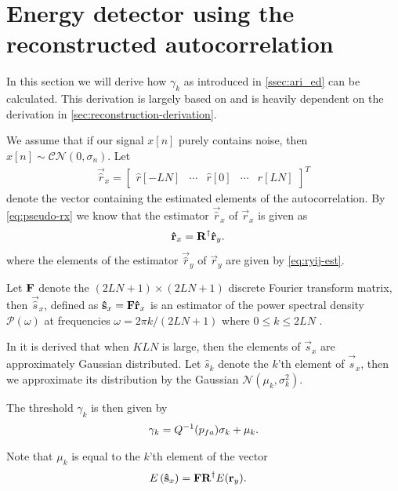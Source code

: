 \documentclass[a4paper, openany, oneside]{memoir}
\begin{document}
\section{Energy detector using the reconstructed autocorrelation}\label{sec:ari_ed_deriv}
In this section we will derive how $\gamma_k$ as introduced in \cref{ssec:ari_ed} can be calculated. This derivation is largely based on \cite{ariananda2012compressive} and is heavily dependent on the derivation in \cref{sec:reconstruction-derivation}.

We assume that if our signal $x[n]$ purely contains noise, then $x[n] \sim \mathcal{CN}(0,\sigma_n)$. 
Let
\begin{align*}
    \vec{\hat{r}}_x = \begin{bmatrix}\hat{r}[-LN]& \cdots& \hat{r}[0]& \cdots & \hat{r}[LN]\end{bmatrix}^T
\end{align*}
denote the vector containing the estimated elements of the autocorrelation. 
By \cref{eq:pseudo-rx} we know that the estimator $\vec{\hat{r}}_x$ of $\vec{r}_x$ is given as
\begin{align*}
\vec{\hat{r}}_x &= \mat{R}^{\dagger}\vec{\hat{r}}_y.
\end{align*} where the elements of the estimator $\vec{\hat{r}}_y$ of $\vec{r}_y$ are given by \cref{eq:ryij-est}.

Let $\mat{F}$ denote the $(2LN+1) \times (2LN+1)$ discrete Fourier transform matrix, then $\vec{\hat{s}}_x$, defined as
$\vec{\hat{s}}_x = \mat{F} \vec{\hat{r}}_x$
is an estimator of the power spectral density $\mathcal{P}(\omega)$ at frequencies $\omega = 2\pi k/(2LN+1)$ where $0 \leq k \leq 2LN$ .

In \cite{ariananda2012compressive} it is derived that when $KLN$ is large, then the elements of $\vec{s}_x$ are approximately Gaussian distributed. Let $\hat{s}_k$ denote the $k$'th element of $\vec{\hat{s}}_x$, then we approximate its distribution by the Gaussian $\mathcal{N}(\mu_k, \sigma^2_k)$.

The threshold $\gamma_k$ is then given by 
\begin{align}\label{eq:ari_threshold}
\gamma_k = Q^{-1}(p\ss{fa})\sigma_{k} + \mu_{k}.
\end{align}

Note that $\mu_k$ is equal to the $k$'th element of the vector
\begin{align*}
E\left(\vec{\hat{s}}_x\right) &= \mat{F}\mat{R}^{\dagger}E(\vec{r}_y).
\end{align*}
\end{document}
